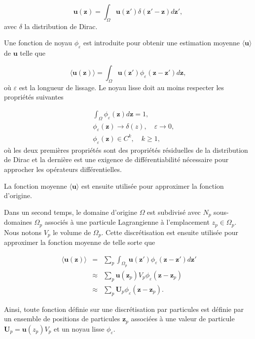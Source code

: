 \begin{equation*}
    \bm{u}(\bm{z}) = \int_{\Omega} \bm{u}(\bm{z'}) \delta(\bm{z'} - \bm{z})  d\bm{z'},
\end{equation*}avec $\delta$ la distribution de Dirac.

Une fonction de noyau $\phi_\varepsilon$ est introduite pour obtenir une estimation moyenne $\langle \bm{u} \rangle$ de $\bm{u}$ telle que

\begin{equation*}
    \langle \bm{u}(\bm{z}) \rangle = \int_{\Omega} \bm{u}(\bm{z'}) \phi_\varepsilon(\bm{z}-\bm{z'}) d\bm{z},
\end{equation*}où $\varepsilon$ est la longueur de lissage. Le noyau lisse doit au moins respecter les propriétés suivantes

\begin{eqnarray*}
    && \int_{\Omega} \phi_\varepsilon(\bm{z}) d\bm{z} = 1,      \\
    && \phi_\varepsilon(\bm{z}) \to \delta(z), \quad \varepsilon \to 0, \\
    && \phi_\varepsilon(\bm{z}) \in C^k,  \quad k \geq 1,
\end{eqnarray*} où les deux premières propriétés sont des propriétés résiduelles de la distribution de Dirac et la dernière est une exigence de différentiabilité nécessaire pour approcher les opérateurs différentielles.

La fonction moyenne $\langle \bm{u} \rangle$ est ensuite utilisée pour approximer la fonction d'origine.

Dans un second temps, le domaine d'origine $\Omega$ est subdivisé avec $N_p$ sous-domaines $\Omega_p$ associés à une particule Lagrangienne à l'emplacement $z_p \in \Omega_p$. Nous notons $V_p$ le volume de $\Omega_p$. Cette discrétisation est ensuite utilisée pour approximer la fonction moyenne de telle sorte que

\begin{eqnarray*}~\label{eq:part_approx}
    \langle \bm{u}(\bm{z}) \rangle &=& \sum_p \int_{\Omega_p} \bm{u}(\bm{z'}) \phi_\varepsilon(\bm{z}-\bm{z'}) d\bm{z'} \\
    &\approx& \sum_p \bm{u}(\bm{z}_p) V_p \phi_\varepsilon (\bm{z}-\bm{z}_p) \\
    &\approx& \sum_p \bm{U}_p \phi_\varepsilon (\bm{z}-\bm{z}_p).
\end{eqnarray*}

Ainsi, toute fonction définie sur une discrétisation par particules est définie par un ensemble de positions de particules $\bm{z}_p$ associées à une valeur de particule $\bm{U}_p = \bm{u}(z_p) V_p$ et un noyau lisse $\phi_\varepsilon$.

